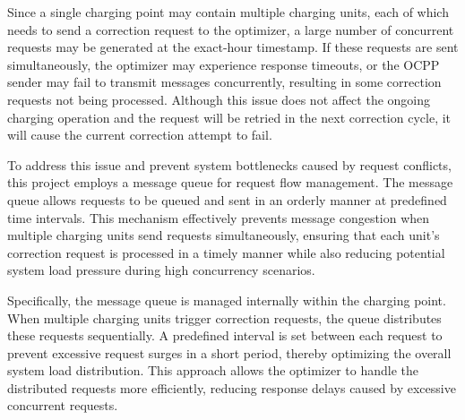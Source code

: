 \documentclass[
	english,
	ruledheaders=section,%
	class=report,%
	thesis={type=Report},%
	accentcolor=9c,%
	custommargins=true,%
	marginpar=false,%
	parskip=half-,%
	fontsize=11pt,%
	logofile={img/tuda_logo.pdf}, %
]{tudapub}
\begin{document}

Since a single charging point may contain multiple charging units, each of which needs to send a correction request to the optimizer, a large number of concurrent requests may be generated at the exact-hour timestamp. If these requests are sent simultaneously, the optimizer may experience response timeouts, or the \ac{OCPP} sender may fail to transmit messages concurrently, resulting in some correction requests not being processed. Although this issue does not affect the ongoing charging operation and the request will be retried in the next correction cycle, it will cause the current correction attempt to fail.


To address this issue and prevent system bottlenecks caused by request conflicts, this project employs a message queue for request flow management. The message queue allows requests to be queued and sent in an orderly manner at predefined time intervals. This mechanism effectively prevents message congestion when multiple charging units send requests simultaneously, ensuring that each unit's correction request is processed in a timely manner while also reducing potential system load pressure during high concurrency scenarios.


Specifically, the message queue is managed internally within the charging point. When multiple charging units trigger correction requests, the queue distributes these requests sequentially. A predefined interval is set between each request to prevent excessive request surges in a short period, thereby optimizing the overall system load distribution. This approach allows the optimizer to handle the distributed requests more efficiently, reducing response delays caused by excessive concurrent requests.
\end{document}
